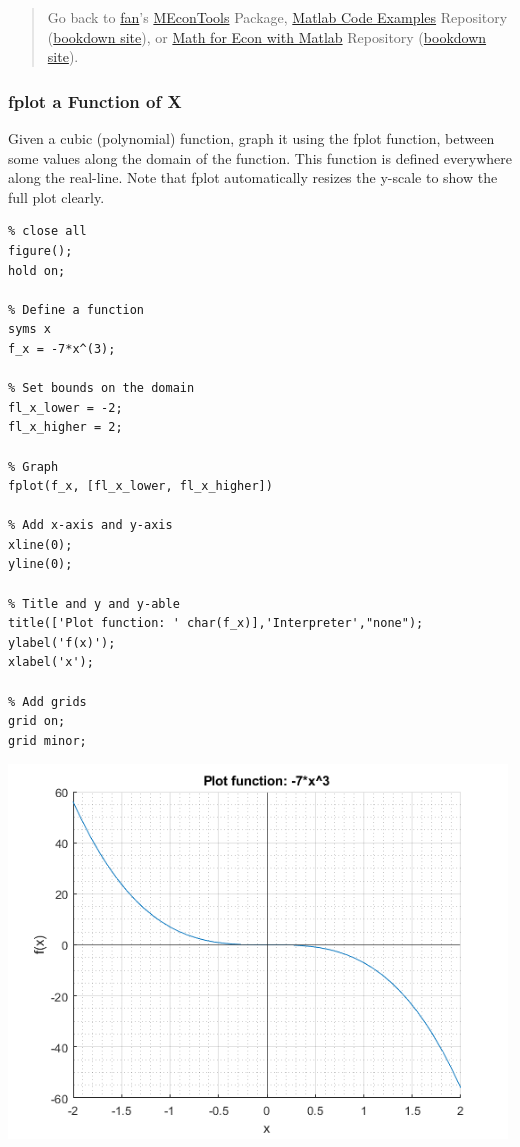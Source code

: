 \documentclass[
]{book}
\begin{document}
\begin{quote}
Go back to \href{http://fanwangecon.github.io/}{fan}'s \href{https://fanwangecon.github.io/MEconTools/}{MEconTools} Package, \href{https://fanwangecon.github.io/M4Econ/}{Matlab Code Examples} Repository (\href{https://fanwangecon.github.io/M4Econ/bookdown}{bookdown site}), or \href{https://fanwangecon.github.io/Math4Econ/}{Math for Econ with Matlab} Repository (\href{https://fanwangecon.github.io/Math4Econ/bookdown}{bookdown site}).
\end{quote}

\hypertarget{fplot-a-function-of-x}{%
\subsubsection{fplot a Function of X}\label{fplot-a-function-of-x}}

Given a cubic (polynomial) function, graph it using the fplot function,
between some values along the domain of the function. This function is
defined everywhere along the real-line. Note that fplot automatically
resizes the y-scale to show the full plot clearly.

\begin{verbatim}
% close all
figure();
hold on;

% Define a function
syms x
f_x = -7*x^(3);

% Set bounds on the domain
fl_x_lower = -2;
fl_x_higher = 2;

% Graph
fplot(f_x, [fl_x_lower, fl_x_higher])

% Add x-axis and y-axis
xline(0);
yline(0);

% Title and y and y-able
title(['Plot function: ' char(f_x)],'Interpreter',"none");
ylabel('f(x)');
xlabel('x');

% Add grids
grid on;
grid minor;
\end{verbatim}

\includegraphics[width=5.20833in,height=\textheight]{img/fs_fplot_images/figure_0.png}
\end{document}
